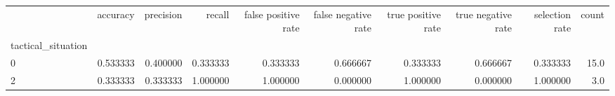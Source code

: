 \begin{tabular}{lrrrrrrrrr}
\toprule
{} &  accuracy &  precision &    recall &  false positive rate &  false negative rate &  true positive rate &  true negative rate &  selection rate &  count \\
tactical\_situation &           &            &           &                      &                      &                     &                     &                 &        \\
\midrule
0                  &  0.533333 &   0.400000 &  0.333333 &             0.333333 &             0.666667 &            0.333333 &            0.666667 &        0.333333 &   15.0 \\
2                  &  0.333333 &   0.333333 &  1.000000 &             1.000000 &             0.000000 &            1.000000 &            0.000000 &        1.000000 &    3.0 \\
\bottomrule
\end{tabular}
